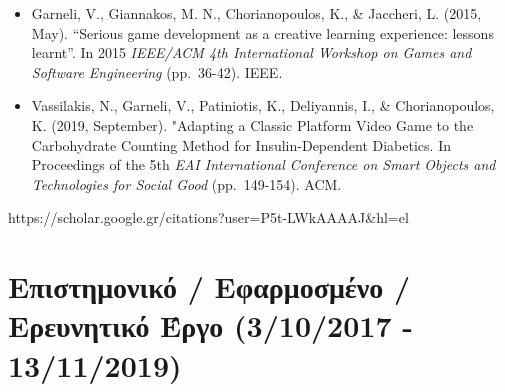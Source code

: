 \documentclass[%
    11pt,
  oneside
  ]{memoir}
\let\oldsection\section
\renewcommand{\section}[1]{%
  \oldsection{#1}
  \leavevmode
  \par
  \vspace{\dimexpr-\baselineskip-\parskip}
}
\begin{document}
\begin{itemize}
\item
  Garneli, V., Giannakos, M. N., Chorianopoulos, K., \& Jaccheri, L.
  (2015, May). ``Serious game development as a creative learning
  experience: lessons learnt''. In 2015 \emph{IEEE/ACM 4th International
  Workshop on Games and Software Engineering} (pp.~36-42). IEEE.
\item
  Vassilakis, N., Garneli, V., Patiniotis, K., Deliyannis, I., \&
  Chorianopoulos, K. (2019, September). "Adapting a Classic Platform
  Video Game to the Carbohydrate Counting Method for Insulin-Dependent
  Diabetics. In Proceedings of the 5th \emph{EAI International
  Conference on Smart Objects and Technologies for Social Good}
  (pp.~149-154). ACM.
\end{itemize}

https://scholar.google.gr/citations?user=P5t-LWkAAAAJ\&hl=el

\hypertarget{ux3b5ux3c0ux3b9ux3c3ux3c4ux3b7ux3bcux3bfux3bdux3b9ux3baux3cc-ux3b5ux3c6ux3b1ux3c1ux3bcux3bfux3c3ux3bcux3adux3bdux3bf-ux3b5ux3c1ux3b5ux3c5ux3bdux3b7ux3c4ux3b9ux3baux3cc-ux3adux3c1ux3b3ux3bf-3102017---13112019}{%
\section{Επιστημονικό / Εφαρμοσμένο / Ερευνητικό Έργο (3/10/2017 -
13/11/2019)}\label{ux3b5ux3c0ux3b9ux3c3ux3c4ux3b7ux3bcux3bfux3bdux3b9ux3baux3cc-ux3b5ux3c6ux3b1ux3c1ux3bcux3bfux3c3ux3bcux3adux3bdux3bf-ux3b5ux3c1ux3b5ux3c5ux3bdux3b7ux3c4ux3b9ux3baux3cc-ux3adux3c1ux3b3ux3bf-3102017---13112019}}
\end{document}

